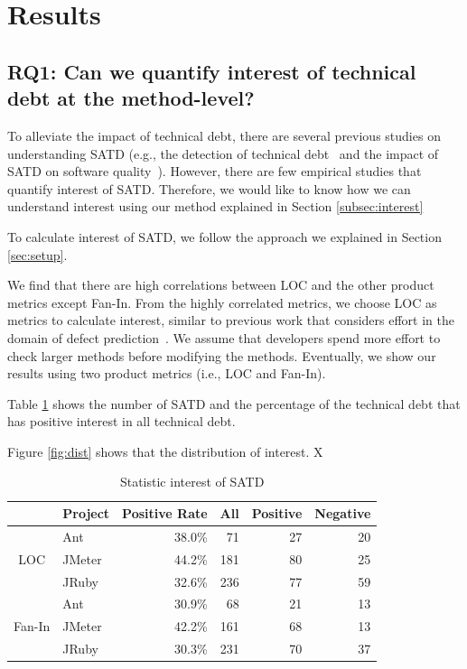\documentclass[conference]{IEEEtran}
\begin{document}
\section{Results}
\subsection{RQ1: Can we quantify interest of technical debt at the method-level?}
To alleviate the impact of technical debt, there are several previous studies on understanding SATD (e.g., the detection of technical debt~\cite{Potdar2014ICSME,Zazworka2013EASE} and the impact of SATD on software quality~\cite{Wehaibi2016SANER}).
However, there are few empirical studies that quantify interest of SATD.
Therefore, we would like to know how we can understand interest using our method explained in Section \ref{subsec:interest}

To calculate interest of SATD, we follow the approach we explained in Section \ref{sec:setup}.

We find that there are high correlations between LOC and the other product metrics except Fan-In. 
From the highly correlated metrics, we choose LOC as metrics to calculate interest, similar to previous work that considers effort in the domain of defect prediction~\cite{Kamei2010ICSM,Kamei2013TSE}. We assume that developers spend more effort to check larger methods before modifying the methods. Eventually, we show our results using two product metrics (i.e., LOC and Fan-In).

Table \ref{tab:statistic} shows the number of SATD and the percentage of the technical debt that has positive interest in all technical debt. 

Figure \ref{fig:dist} shows that the distribution of interest. X

\begin{table}[tb]
  \caption{Statistic interest of SATD}
  \label{tab:statistic}
  \centering

  \begin{tabular}{cl|r|rrr}
  \hline
      &  Project & Positive Rate & All & Positive & Negative \\
  \hline
        & Ant    & 38.0\% &  71 &  27  &  20 \\
   LOC  & JMeter & 44.2\% & 181 &  80  &  25 \\
        & JRuby  & 32.6\% & 236 &  77  &  59 \\
  \hline
        & Ant    & 30.9\% &  68 &  21  &  13 \\
Fan-In  & JMeter & 42.2\% & 161 &  68  &  13 \\
        & JRuby  & 30.3\% & 231 &  70  &  37 \\
  \hline
  \end{tabular}
\end{table}
\end{document}

